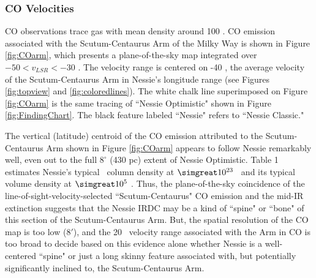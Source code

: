 \subsubsection{CO Velocities}
\label{CO}
CO observations trace gas with mean density around 100 \cc.   CO emission associated with the Scutum-Centaurus Arm of the Milky Way is shown in Figure \ref{fig:COarm}, which presents a plane-of-the-sky map integrated over  $-50 <v_{LSR}< -30$ \kms.  The velocity range is centered on  -40 \kms, the average velocity of the Scutum-Centaurus Arm in Nessie's longitude range (see Figures \ref{fig:topview} and \ref{fig:coloredlines}).  The white chalk line superimposed on Figure \ref{fig:COarm} is the same tracing of ``Nessie Optimistic" shown in Figure \ref{fig:FindingChart}.  The black feature labeled ``Nessie" refers to ``Nessie Classic."   

The vertical (latitude) centroid of the CO emission  attributed to the Scutum-Centaurus Arm \citep{Dame2011} shown in Figure \ref{fig:COarm} appears to follow Nessie remarkably well, even out to the full $8^\circ$ (430 pc) extent of Nessie Optimistic.  Table 1 estimates Nessie's typical \htwo\ column density at $\simgreat 10^{23}$ \cmsq\ and its typical volume density at $\simgreat 10^5$ \cc.    Thus, the plane-of-the-sky coincidence of the line-of-sight-velocity-selected ``Scutum-Centaurus" CO emission  and the mid-IR extinction suggests that the Nessie IRDC may be a kind of ``spine" or ``bone" of this section of the Scutum-Centaurus Arm.   But, the spatial resolution of the CO map is too low ($8'$), and the 20 \kms\ velocity range associated with the Arm in CO is too broad to decide based on this evidence alone whether Nessie is a well-centered ``spine" or just a long skinny feature associated with, but potentially significantly inclined to, the Scutum-Centaurus Arm.   